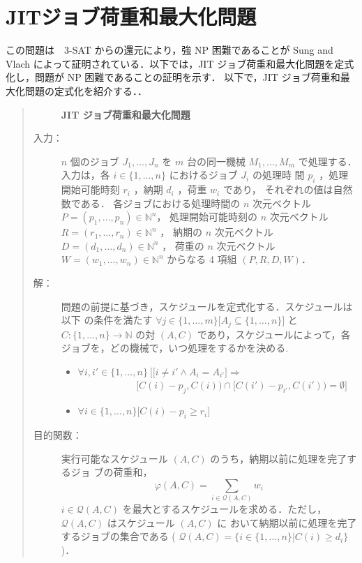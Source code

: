 \documentclass[12pt]{optlab-bachelor}
\begin{document}
\section{JITジョブ荷重和最大化問題}\label{3_s_1}
この問題は　\textsc{3-SAT} からの還元により，強 NP 困難であることが Sung and Vlach \cite{SJIT} によって証明されている．以下では，JIT ジョブ荷重和最大化問題を定式化し，問題が NP 困難であることの証明を示す．
以下で，JIT ジョブ荷重和最大化問題の定式化を紹介する．．
\begin{quote}
  \begin{description}
    \item[] {\bf JIT ジョブ荷重和最大化問題}
    \item[入力：] $n$ 個のジョブ $J_1,\ldots,J_n$ を $m$ 台の同一機械 $M_1,\ldots,M_m$
    で処理する．入力は，各 $i \in \{1,\ldots,n\}$ におけるジョブ $J_i$ の処理時
    間 $p_i$ ，処理開始可能時刻 $r_i$ ，納期 $d_i$ ，荷重 $w_i$ であり，
    それぞれの値は自然数である．
    各ジョブにおける処理時間の $n$ 次元ベクトル $P = (p_1,\ldots,p_n) \in \mathbb{N}^n$，
    処理開始可能時刻の $n$ 次元ベクトル $R = (r_1,\ldots,r_n) \in \mathbb{N}^n$ ，
    納期の $n$ 次元ベクトル $D = (d_1,\ldots,d_n) \in \mathbb{N}^n$ ，
    荷重の $n$ 次元ベクトル $W = (w_1,\ldots,w_n) \in \mathbb{N}^n$ からなる 4 項組 $(P,R,D,W)$．
    \item[解：] 問題の前提に基づき，スケジュールを定式化する．スケジュールは以下
    の条件を満たす $\forall j \in \{1,\ldots,m\}\big[A_j \subseteq
    \{1,\ldots,n\}\big]$ と $C : \{1,\ldots,n\} \to \mathbb{N}$ の対 $(A,
    C)$ であり，スケジュールによって，各ジョブを，どの機械で，いつ処理をするかを決める.
    \begin{itemize}
      \item $\forall i, i' \in \{1,\ldots,n\}\ \Big[ \big[i \neq i' \land A_i = A_{i'}\big] \Rightarrow$ \\ $~~~~~~~~~~~~~~~~~~~~~~~~~~~[C(i) - p_j, C(i)) \cap [C(i') - p_{i'}, C(i')) = \emptyset \Big]$
      \item  $\forall i \in \{1,\ldots,n\}\big[C(i) - p_i \ge r_i\big]$
    \end{itemize}
    \item[目的関数：] 実行可能なスケジュール $(A, C)$ のうち，納期以前に処理を完了するジョ
    ブの荷重和，
    \begin{displaymath}
      \displaystyle \varphi(A,C) = \sum_{i \in \mathcal{Q}(A,C)}w_i
    \end{displaymath}
    $i \in \mathcal{Q}(A,C)$ を最大とするスケジュールを求める．ただし，
    $\mathcal{Q}(A, C)$ はスケジュール $(A, C)$ に
    おいて納期以前に処理を完了するジョブの集合である (
    $\mathcal{Q}(A, C) = \{i \in \{1,\ldots, n\} | C(i) \ge d_i \}$ )．
  \end{description}
\end{quote}
\end{document}
